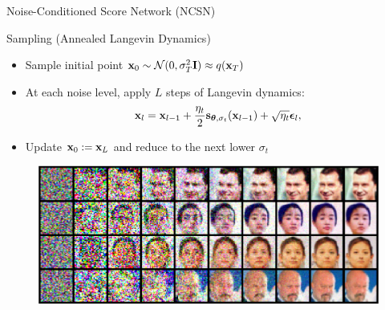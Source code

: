 \documentclass{beamer}
\begin{document}
\begin{frame}{Noise-Conditioned Score Network (NCSN)}
	\begin{block}{Sampling (Annealed Langevin Dynamics)}
		\begin{itemize}
			\item Sample initial point $\mathbf{x}_0 \sim \mathcal{N}(0, \sigma_T^2 \mathbf{I}) \approx q(\mathbf{x}_T)$
			\item At each noise level, apply $L$ steps of Langevin dynamics:
			\vspace{-0.2cm}
			\[
				\mathbf{x}_l = \mathbf{x}_{l-1} + \frac{\eta_t}{2} \mathbf{s}_{\boldsymbol{\theta}, \sigma_t}(\mathbf{x}_{l-1}) + \sqrt{\eta_t} \boldsymbol{\epsilon}_l,
			\] 
			\vspace{-0.5cm}
			\item Update $\mathbf{x}_0 := \mathbf{x}_L$ and reduce to the next lower $\sigma_t$
		\end{itemize}
	\end{block}
    \eqpause
	\begin{figure}
		\includegraphics[width=0.9\linewidth]{figs/ald}
	\end{figure}
\end{frame}
\end{document}
